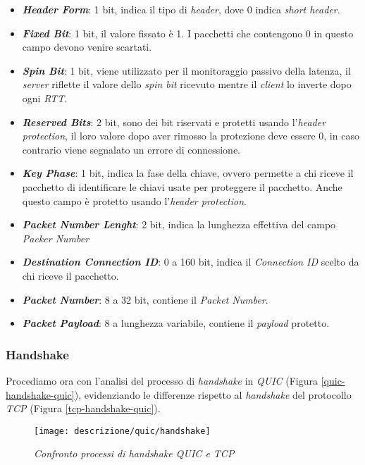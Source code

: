 \begin{itemize}
    \item \textit{\textbf{Header Form}}: 1 bit, indica il tipo di \emph{header}, dove 0 indica \emph{short header}.
    \item \textit{\textbf{Fixed Bit}}: 1 bit, il valore fissato è 1. I pacchetti che contengono 0 in questo campo devono venire scartati.
    \item \textit{\textbf{Spin Bit}}: 1 bit, viene utilizzato per il monitoraggio passivo della latenza, il \emph{server} riflette il valore dello \emph{spin bit} ricevuto mentre il \emph{client} lo inverte dopo ogni \emph{RTT}.
    \item \textit{\textbf{Reserved Bits}}: 2 bit, sono dei bit riservati e protetti usando l'\emph{header protection}, il loro valore dopo aver rimosso la protezione deve essere 0, in caso contrario viene segnalato un errore di connessione.
    \item \textit{\textbf{Key Phase}}: 1 bit, indica la fase della chiave, ovvero permette a chi riceve il pacchetto di identificare le chiavi usate per proteggere il pacchetto. Anche questo campo è protetto usando l'\emph{header protection}.
    \item \textit{\textbf{Packet Number Lenght}}: 2 bit, indica la lunghezza effettiva del campo \emph{Packer Number}
    \item \textit{\textbf{Destination Connection ID}}: 0 a 160 bit, indica il \emph{Connection ID} scelto da chi riceve il pacchetto.
    \item \textit{\textbf{Packet Number}}: 8 a 32 bit, contiene il \emph{Packet Number}.
    \item \textit{\textbf{Packet Payload}}: 8 a lunghezza variabile, contiene il \emph{payload} protetto. 
    \end{itemize}
\subsubsection{Handshake}
Procediamo ora con l'analisi del processo di \emph{handshake} in \emph{QUIC} (Figura \ref{quic-handshake-quic}), evidenziando le differenze rispetto al \emph{handshake} del protocollo \emph{TCP} (Figura \ref{tcp-handshake-quic}).
\begin{figure}[!h]
    \centering
    \texttt{[image: descrizione/quic/handshake]}  
    \caption{\emph{Confronto processi di handshake QUIC e TCP}}
    \label{quic-handshake-quic}
    \label{tcp-handshake-quic}
    \label{first}
    \label{zero}
    
\end{figure}

